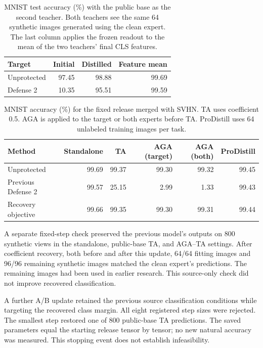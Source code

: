 \begin{table}[t]
\centering\small
\caption{MNIST test accuracy (\%) with the public base as the second teacher. Both teachers see the same 64 synthetic images generated using the clean expert. The last column applies the frozen readout to the mean of the two teachers' final CLS features.}
\begin{tabular}{lrrr}
\toprule
Target & Initial & Distilled & Feature mean \\
\midrule
Unprotected & 97.45 & 98.88 & 99.69 \\
Defense 2 & 10.35 & 95.51 & 99.59 \\
\bottomrule
\end{tabular}
\end{table}

\begin{table}[t]
\centering\small
\caption{MNIST accuracy (\%) for the fixed release merged with SVHN. TA uses coefficient 0.5. AGA is applied to the target or both experts before TA. ProDistill uses 64 unlabeled training images per task.}
\begin{tabular}{lrrrrr}
\toprule
Method & Standalone & TA & AGA (target) & AGA (both) & ProDistill \\
\midrule
Unprotected & 99.69 & 99.37 & 99.30 & 99.32 & 99.45 \\
Previous Defense 2 & 99.57 & 25.15 & 2.99 & 1.33 & 99.43 \\
Recovery objective & 99.66 & 99.35 & 99.30 & 99.31 & 99.44 \\
\bottomrule
\end{tabular}
\end{table}


A separate fixed-step check preserved the previous model's outputs on 800
synthetic views in the standalone, public-base TA, and AGA--TA settings.
After coefficient recovery, both before and after this update, 64/64 fitting
images and 96/96 remaining synthetic images matched the clean expert's
predictions. The remaining images had been used in earlier research.
This source-only check did not improve recovered classification.


A further A/B update retained the previous source classification conditions
while targeting the recovered class margin. All eight registered step sizes
were rejected. The smallest step restored one of 800 public-base TA predictions.
The saved parameters equal the starting release tensor by tensor; no new natural
accuracy was measured. This stopping event does not establish infeasibility.

